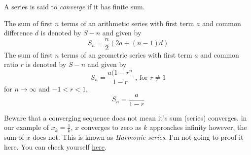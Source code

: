 \vspace{5mm}

\noindent A series is said to \textit{converge} if it has finite sum.

\vspace{5mm}

\noindent The sum of first $n$ terms of an arithmetic series with first term $a$ and common difference $d$ is denoted by $S-n$ and given by
\begin{equation}\label{eq5}
S_n = \frac{n}{2}(2a+(n-1)d)
\end{equation}
\noindent The sum of first $n$ terms of an geometric series with first term $a$ and common ratio $r$ is denoted by $S-n$ and given by
\begin{equation}\label{eq6}
S_n = \frac{a(1-r^n}{1-r} \text{ , for } r \neq 1
\end{equation}
\noindent for $n \to \infty$ and $-1<r<1$,
\begin{equation}\label{eq7}
S_n = \frac{a}{1-r}
\end{equation}

\noindent Beware that a converging sequence does not mean it's sum (series) converges. in our example of $x_k = \frac{1}{k}$, $x$ converges to zero as $k$ approaches infinity however, the sum of $x$ does not. This is known as \textit{Harmonic series}. I'm not going to proof it here. You can check yourself \href{https://proofwiki.org/wiki/Harmonic_Series_is_Divergent}{here}.